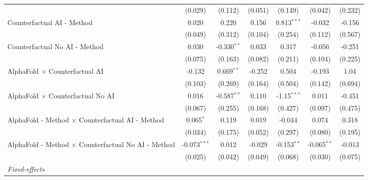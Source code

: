 \begin{tabular}{lcccccc}
                                                              & (0.029)        & (0.112)        & (0.051)       & (0.149)       & (0.042)       & (0.232)\\   
   Counterfactual AI - Method                                 & 0.020          & 0.220          & 0.156         & 0.813$^{***}$ & -0.032        & -0.156\\   
                                                              & (0.049)        & (0.312)        & (0.104)       & (0.254)       & (0.112)       & (0.567)\\   
   Counterfactual No AI - Method                              & 0.030          & -0.330$^{**}$  & 0.033         & 0.317         & -0.056        & -0.251\\   
                                                              & (0.075)        & (0.163)        & (0.082)       & (0.211)       & (0.104)       & (0.225)\\   
   AlphaFold $\times$ Counterfactual AI                       & -0.132         & 0.669$^{**}$   & -0.252        & 0.504         & -0.193        & 1.04\\   
                                                              & (0.103)        & (0.269)        & (0.164)       & (0.504)       & (0.142)       & (0.694)\\   
   AlphaFold $\times$ Counterfactual No AI                    & 0.016          & -0.587$^{**}$  & 0.110         & -1.15$^{***}$ & 0.011         & -0.451\\   
                                                              & (0.067)        & (0.255)        & (0.168)       & (0.427)       & (0.097)       & (0.475)\\   
   AlphaFold - Method $\times$ Counterfactual AI - Method     & 0.065$^{*}$    & 0.119          & 0.019         & -0.044        & 0.074         & 0.318\\   
                                                              & (0.034)        & (0.175)        & (0.052)       & (0.297)       & (0.080)       & (0.195)\\   
   AlphaFold - Method $\times$ Counterfactual No AI - Method  & -0.073$^{***}$ & 0.012          & -0.029        & -0.153$^{**}$ & -0.065$^{**}$ & -0.013\\   
                                                              & (0.025)        & (0.042)        & (0.049)       & (0.068)       & (0.030)       & (0.075)\\   
   \midrule
   \emph{Fixed-effects}\\

\end{tabular}
